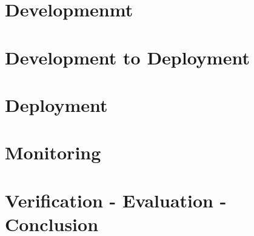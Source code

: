 \documentclass[10pt,a4paper,bibliography=totoc]{scrbook}
\begin{document}
  


\part{Developmenmt}

  

  

  

  

  


\part{Development to Deployment}

  

  


\part{Deployment}

  


\part{Monitoring}

  


\part{Verification - Evaluation - Conclusion}


  

  

  


\part{}
\end{document}
